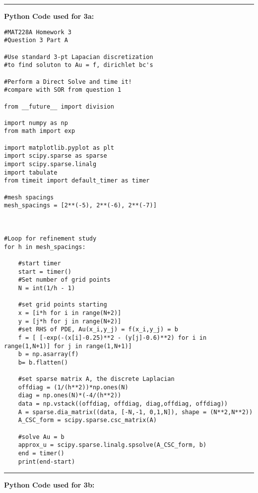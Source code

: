 \documentclass[12pt]{article}
\begin{document}
\noindent\rule{17cm}{0.4pt}
\noindent \textbf{Python Code used for 3a:}
\begin{verbatim}
#MAT228A Homework 3
#Question 3 Part A

#Use standard 3-pt Lapacian discretization 
#to find soluton to Au = f, dirichlet bc's

#Perform a Direct Solve and time it!
#compare with SOR from question 1

from __future__ import division

import numpy as np
from math import exp

import matplotlib.pyplot as plt
import scipy.sparse as sparse
import scipy.sparse.linalg
import tabulate
from timeit import default_timer as timer 

#mesh spacings
mesh_spacings = [2**(-5), 2**(-6), 2**(-7)]



#Loop for refinement study
for h in mesh_spacings:

	#start timer
	start = timer()
	#Set number of grid points
	N = int(1/h - 1)

	#set grid points starting 
	x = [i*h for i in range(N+2)]
	y = [j*h for j in range(N+2)]
	#set RHS of PDE, Au(x_i,y_j) = f(x_i,y_j) = b
	f = [ [-exp(-(x[i]-0.25)**2 - (y[j]-0.6)**2) for i in range(1,N+1)] for j in range(1,N+1)] 
	b = np.asarray(f)
	b= b.flatten()

	#set sparse matrix A, the discrete Laplacian
	offdiag = (1/(h**2))*np.ones(N)
	diag = np.ones(N)*(-4/(h**2))
	data = np.vstack((offdiag, offdiag, diag,offdiag, offdiag))
	A = sparse.dia_matrix((data, [-N,-1, 0,1,N]), shape = (N**2,N**2))
	A_CSC_form = scipy.sparse.csc_matrix(A)

	#solve Au = b
	approx_u = scipy.sparse.linalg.spsolve(A_CSC_form, b)
	end = timer()
	print(end-start)

\end{verbatim}
\noindent\rule{17cm}{0.4pt}
\noindent \textbf{Python Code used for 3b:}
\end{document}

